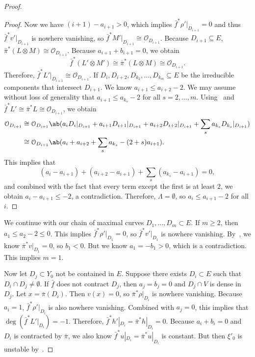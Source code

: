\documentclass{amsart}
\theoremstyle{definition}
\theoremstyle{remark}
\theoremstyle{plain}
\theoremstyle{definition}
\theoremstyle{remark}
\newcommand{\mc}[1]{\mathcal{#1}}
\newcommand{\1}{\mathbf{1}}
\newcommand{\2}{\mathbf{2}}
\newcommand{\3}{\mathbf{3}}
\begin{document}
\begin{proof}
\begin{proof}
        Now we have $(i+1) - a_{i+1} > 0$, which implies $\bar{f}^* \rho'|_{D_{i+1}} = 0$ and thus $\bar{f}^* v'|_{D_{i+1}}$ is nowhere vanishing, so $\bar{f}^*M'|_{D_{i+1}} \cong \mc{O}_{D_{i+1}}$. Because $D_{i+1} \subseteq E$, $\bar{\pi}^*(L \otimes M) \cong \mc{O}_{D_{i+1}}$. Because $a_{i+1} + b_{i+1} = 0$, we obtain
        \[ \bar{f}^* (L' \otimes M') \cong \bar{\pi}^* (L \otimes M) \cong \mc{O}_{D_{i+1}}. \]
        Therefore, $\bar{f}^*L' |_{D_{i+1}} \cong \mc{O}_{D_{i+1}}$. If $D_i, D_{i+2}, D_{k_2}, \ldots, D_{k_m} \subseteq E$ be the irreducible components that intersect $D_{i+1}$. We know $a_{i+1} \leq a_{i+2}-2$. We may assume without loss of generality that $a_{i+1} \leq a_{k_s} - 2$ for all $s = 2,\ldots,m$. Using~ and $\bar{f}^* L' \cong \bar{\pi}^* L \cong \mc{O}_{D_{i+1}}$, we obtain
        \begin{align*}
            \mc{O}_{D_{i+1}} &\cong \mc{O}_{D_{i+1}}\ab(a_i D_i|_{D_{i+1}} + a_{i+1} D_{i+1}|_{D_{i+1}} + a_{i+2}D_{i+2}|_{D_{i+1}} + \sum_s a_{k_s} D_{k_s}|_{D_{i+1}}) \\
            &\cong \mc{O}_{D_{i+1}}\ab(a_i + a_{i+2} + \sum_s a_{k_s} - (2+s)a_{i+1}).
        \end{align*}
        This implies that
        \[ (a_i - a_{i+1}) + (a_{i+2} - a_{i+1}) + \sum_s (a_{k_s} - a_{i+1}) = 0, \]
        and combined with the fact that every term except the first is at least $2$, we obtain $a_i - a_{i+1} \leq -2$, a contradiction. Therefore, $\Lambda = \emptyset$, so $a_i \leq a_{i+1} - 2$ for all $i$.
    \end{proof}
    
    We continue with our chain of maximal curves $D_1, \ldots, D_m \subset E$. If $m \geq 2$, then $a_1 \leq a_2 - 2 \leq 0$. This implies $\bar{f}^* \rho'|_{D_1} = 0$, so $\bar{f}^* v'|_{D_1}$ is nowhere vanishing. By~, we know $\bar{\pi}^* v|_{D_1} = 0$, so $b_1 < 0$. But we know $a_1 = -b_1 > 0$, which is a contradiction. This implies $m=1$.

    Now let $D_j \subset Y_0$ not be contained in $E$. Suppose there exists $D_i \subset E$ such that $D_i \cap D_j \neq \emptyset$. If $\bar{f}$ does not contract $D_j$, then $a_j = b_j = 0$ and $D_j \cap V$ is dense in $D_j$. Let $x = \bar{\pi}(D_i)$. Then $v(x) = 0$, so $\bar{\pi}^* \rho|_{D_i}$ is nowhere vanishing. Because $a_i = 1$, $\bar{f}^* \rho'|_{D_i}$ is also nowhere vanishing. Combined with $a_j = 0$, this implies that $\deg(\bar{f}^* L'|_{D_i}) = -1$. Therefore, $\bar{f}^* h'|_{D_i} = \bar{\pi}^*h|_{D_i} = 0$. Because $a_i + b_i = 0$ and $D_i$ is contracted by $\bar{\pi}$, we also know $\bar{f}^* u|_{D_i} = \bar{\pi}^* u|_{D_i}$ is constant. But then $\xi'_0$ is unstable by~.


\end{proof}
\end{document}
